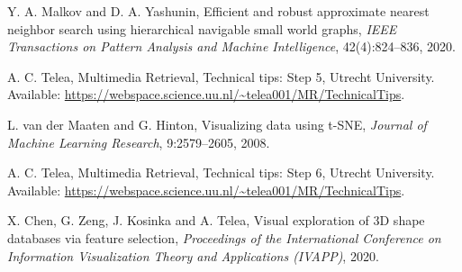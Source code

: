 \documentclass[10pt,a4paper]{article}
\begin{document}
\begin{description}[leftmargin=2.2em,labelwidth=2em,style=sameline]
\item[{[24]}] Y. A. Malkov and D. A. Yashunin, Efficient and robust approximate nearest neighbor search using hierarchical
  navigable small world graphs, \emph{IEEE Transactions on Pattern Analysis and Machine Intelligence}, 42(4):824--836, 2020.
\item[{[25]}] A. C. Telea, Multimedia Retrieval, Technical tips: Step 5, Utrecht University. Available:
  \url{https://webspace.science.uu.nl/~telea001/MR/TechnicalTips}.
\item[{[26]}] L. van der Maaten and G. Hinton, Visualizing data using t-SNE, \emph{Journal of Machine Learning Research},
  9:2579--2605, 2008.
\item[{[27]}] A. C. Telea, Multimedia Retrieval, Technical tips: Step 6, Utrecht University. Available:
  \url{https://webspace.science.uu.nl/~telea001/MR/TechnicalTips}.
\item[{[28]}] X. Chen, G. Zeng, J. Kosinka and A. Telea, Visual exploration of 3D shape databases via feature selection,
  \emph{Proceedings of the International Conference on Information Visualization Theory and Applications (IVAPP)}, 2020.
\end{description}
\end{document}
